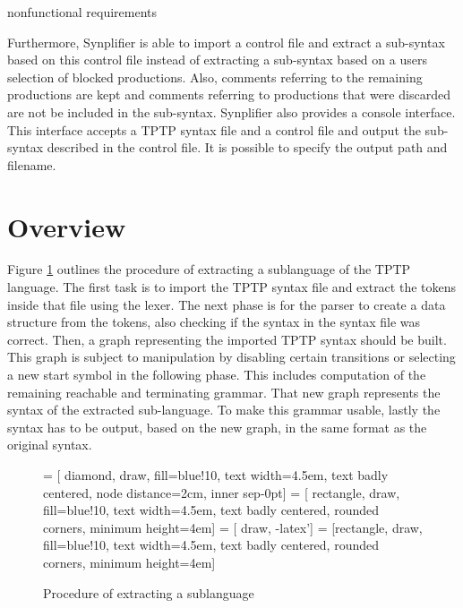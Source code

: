 nonfunctional requirements

Furthermore, \ac{Synplifier} is able to import a control file and extract a sub-syntax based on this control file instead of extracting a sub-syntax based on a users selection of blocked productions.
Also, comments referring to the remaining productions are kept and comments referring to productions that were discarded are not be included in the sub-syntax.
\ac{Synplifier} also provides a console interface. This interface accepts a \ac{TPTP} syntax file and a control file and output the sub-syntax described in the control file. It is possible to specify the output path and filename.

\section{Overview}\label{sec:ConceptOverview}
Figure \ref{fig:ConceptProcessSublanguage} outlines the procedure of extracting a sublanguage of the \ac{TPTP} language.
The first task is to import the \ac{TPTP} syntax file and extract the tokens inside that file using the lexer.
The next phase is for the parser to create a data structure from the tokens, also checking if the syntax in the syntax file was correct.
Then, a graph representing the imported \ac{TPTP} syntax should be built.\\
This graph is subject to manipulation by disabling certain transitions or selecting a new start symbol in the following phase.
This includes computation of the remaining reachable and terminating grammar.
That new graph represents the syntax of the extracted sub-language.
To make this grammar usable, lastly the syntax has to be output, based on the new graph, in the same format as the original syntax.
\begin{figure}[H]
 = [ diamond, draw, fill=blue!10, text width=4.5em, text badly centered, node distance=2cm, inner sep-0pt]  
 = [ rectangle, draw, fill=blue!10, text width=4.5em, text badly centered, rounded corners, minimum height=4em]  
 = [ draw, -latex']  
 = [rectangle, draw, fill=blue!10, text width=4.5em, text badly centered, rounded corners, minimum height=4em]  
\begin{center}
\end{center}
\caption{Procedure of extracting a sublanguage}
\label{fig:ConceptProcessSublanguage}
\end{figure}

